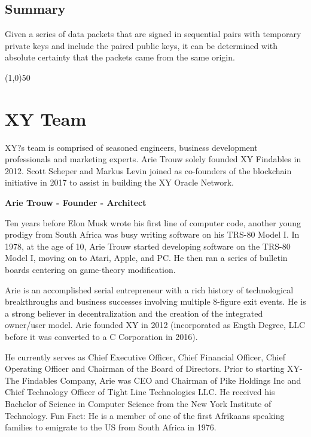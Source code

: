 \documentclass{article}
\begin{document}
\subsection {Summary}
Given a series of data packets that are signed in sequential pairs with temporary private keys and include the paired public keys, it can be determined with absolute \gls{certainty} that the packets came from the same origin.

\begin{center}
\line(1,0){50}
\end{center}
\clearpage

\section {XY Team}
XY?s team is comprised of seasoned engineers, business development professionals and marketing experts. Arie Trouw solely founded XY Findables in 2012. Scott Scheper and Markus Levin joined as co-founders of the blockchain initiative in 2017 to assist in building the XY Oracle Network.

\begin {framed}
\begin {center}
\textbf{Arie Trouw - Founder - Architect}\par
\end {center}
Ten years before Elon Musk wrote his first line of computer code, another young prodigy from South Africa was busy writing software on his TRS-80 Model I. In 1978, at the age of 10, Arie Trouw started developing software on the TRS-80 Model I, moving on to Atari, Apple, and PC. He then ran a series of bulletin boards centering on game-theory modification.

Arie is an accomplished serial entrepreneur with a rich history of technological breakthroughs and business successes involving multiple 8-figure exit events. He is a strong believer in decentralization and the creation of the integrated owner/user model. Arie founded XY in 2012 (incorporated as Ength Degree, LLC before it was converted to a C Corporation in 2016).

He currently serves as Chief Executive Officer, Chief Financial Officer, Chief Operating Officer and Chairman of the Board of Directors. Prior to starting XY-The Findables Company, Arie was CEO and Chairman of Pike Holdings Inc and Chief Technology Officer of Tight Line Technologies LLC. He received his Bachelor of Science in Computer Science from the New York Institute of Technology. Fun Fact: He is a member of one of the first Afrikaans speaking families to emigrate to the US from South Africa in 1976.

\end {framed}
\end{document}
